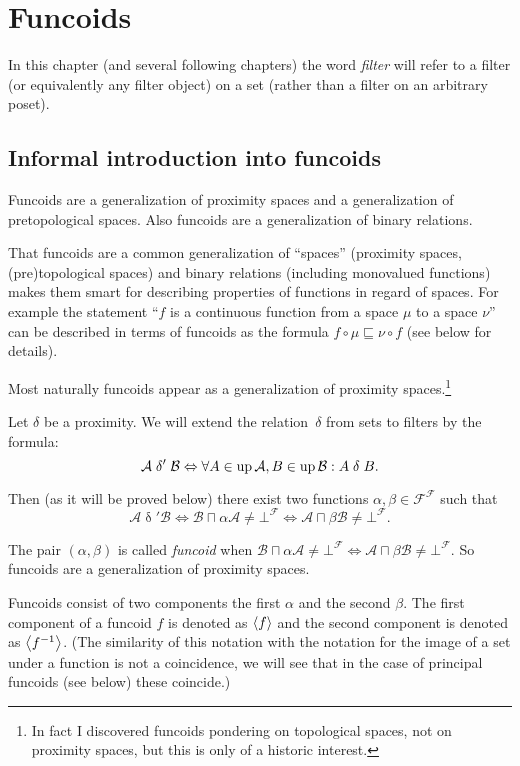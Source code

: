 \chapter{Funcoids}

In this chapter (and several following chapters) the word \emph{filter}
will refer to a filter (or equivalently any filter object) on a set
(rather than a filter on an arbitrary poset).


\section{Informal introduction into funcoids}

Funcoids are a generalization of proximity spaces and a generalization
of pretopological spaces. Also funcoids are a generalization of binary
relations.

That funcoids are a common generalization of ``spaces'' (proximity
spaces, (pre)topological spaces) and binary relations (including monovalued
functions) makes them smart for describing properties of functions
in regard of spaces. For example the statement ``$f$ is a continuous
function from a space $\mu$ to a space $\nu$'' can be described
in terms of funcoids as the formula $f\circ\mu\sqsubseteq\nu\circ f$
(see below for details).

Most naturally funcoids appear as a generalization of proximity spaces.\footnote{In fact I discovered funcoids pondering on topological spaces, not on proximity spaces, but this is only of a historic interest.}

Let $\delta$ be a proximity. We will extend the relation~$\delta$
from sets to filters by the formula:
\[
\mathcal{A}\mathrel\delta'\mathcal{B}\Leftrightarrow\forall
A\in\operatorname{up}\mathcal{A},B\in\operatorname{up}\mathcal{B}:A\mathrel\delta B.
\]


Then (as it will be proved below) there exist two functions
$\alpha,\beta\in\mathscr{F}^{\mathscr{F}}$
such that
\[
\mathcal{A}\mathrel\delta'\mathcal{B}\Leftrightarrow\mathcal{B}
\sqcap\alpha\mathcal{A}\ne\bot^{\mathscr{F}}\Leftrightarrow\mathcal{A}
\sqcap\beta\mathcal{B}\ne\bot^{\mathscr{F}}.
\]


The pair $(\alpha,\beta)$ is called \emph{funcoid} when
$\mathcal{B}\sqcap\alpha\mathcal{A}\ne\bot^{\mathscr{F}}\Leftrightarrow\mathcal{
A}\sqcap\beta\mathcal{B}\ne\bot^{\mathscr{F}}$.
So funcoids are a generalization of proximity spaces.

Funcoids consist of two components the first $\alpha$ and the second
$\beta$. The first component of a funcoid $f$ is denoted as $\left\langle f\right\rangle$
and the second component is denoted as $\left\langle f^{-1}\right\rangle$. (The similarity
of this notation with the notation for the image of a set under a
function is not a coincidence, we will see that in the case of principal
funcoids (see below) these coincide.)

